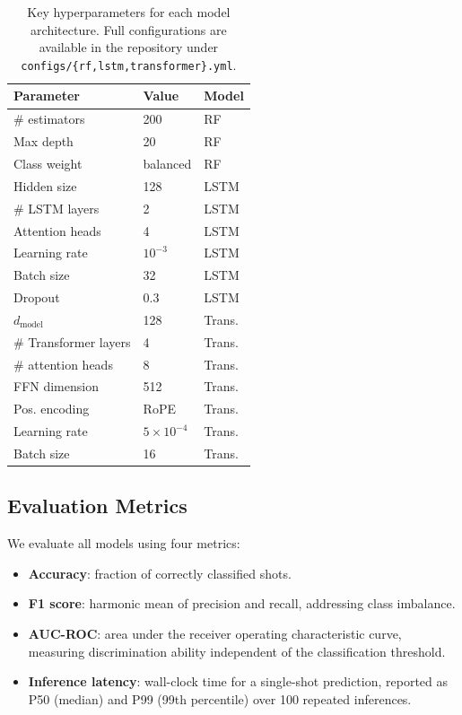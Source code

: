 \documentclass[twocolumn]{article}
\begin{document}
\begin{table}[t]
\centering
\caption{Key hyperparameters for each model architecture.
  Full configurations are available in the repository
  under \texttt{configs/\{rf,lstm,transformer\}.yml}.}
\label{tab:hyperparams}
\small
\begin{tabular}{@{}lll@{}}
\toprule
\textbf{Parameter} & \textbf{Value} & \textbf{Model} \\
\midrule
\# estimators       & 200             & RF \\
Max depth            & 20              & RF \\
Class weight         & balanced        & RF \\
\midrule
Hidden size          & 128             & LSTM \\
\# LSTM layers       & 2               & LSTM \\
Attention heads      & 4               & LSTM \\
Learning rate        & $10^{-3}$       & LSTM \\
Batch size           & 32              & LSTM \\
Dropout              & 0.3             & LSTM \\
\midrule
$d_{\text{model}}$   & 128             & Trans. \\
\# Transformer layers & 4              & Trans. \\
\# attention heads    & 8              & Trans. \\
FFN dimension        & 512             & Trans. \\
Pos. encoding        & RoPE            & Trans. \\
Learning rate        & $5 \times 10^{-4}$ & Trans. \\
Batch size           & 16              & Trans. \\
\bottomrule
\end{tabular}
\end{table}

\subsection{Evaluation Metrics}

We evaluate all models using four metrics:
\begin{itemize}[noitemsep]
  \item \textbf{Accuracy}: fraction of correctly classified shots.
  \item \textbf{F1 score}: harmonic mean of precision and recall,
    addressing class imbalance.
  \item \textbf{AUC-ROC}: area under the receiver operating
    characteristic curve, measuring discrimination ability
    independent of the classification threshold.
  \item \textbf{Inference latency}: wall-clock time for a
    single-shot prediction, reported as P50 (median) and
    P99 (99th percentile) over 100 repeated inferences.
\end{itemize}
\end{document}
